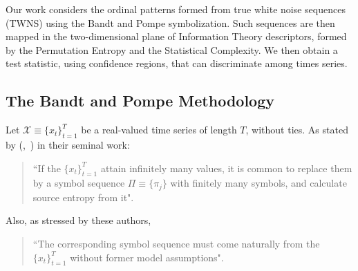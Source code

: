 \documentclass[alpha-refs]{wiley-article}
\newcommand{\Mycite}[1]{%
(\citeauthor{#1},~\citeyear{#1})}
\begin{document}
Our work considers the ordinal patterns formed from true white noise sequences (TWNS) using the Bandt and Pompe symbolization.
Such sequences are then mapped in the two-dimensional plane of Information Theory descriptors, formed by the Permutation Entropy and the Statistical Complexity.
We then obtain a test statistic, using confidence regions, that can discriminate among times series.

\subsection{The Bandt and Pompe Methodology}\label{Sec:BPMethodology}

Let ${\mathcal X} \equiv \{x_t\}_{t=1}^{T}$ be a real-valued time series of length $T$, without ties. 
As stated by \Mycite{PermutationEntropyBandtPompe} in their seminal work:  
\begin{quote}
``If the $\{x_t\}_{t=1}^{T}$ attain infinitely many values, it is common to replace them by a symbol sequence 
$\Pi \equiv \{\pi_j\}$ with finitely many symbols, and calculate source entropy from it".
\end{quote}
Also, as stressed by these authors, 
\begin{quote}
``The corresponding symbol sequence must come 
naturally from the $\{x_t\}_{t=1}^{T}$ without former model assumptions".
\end{quote}
\end{document}
